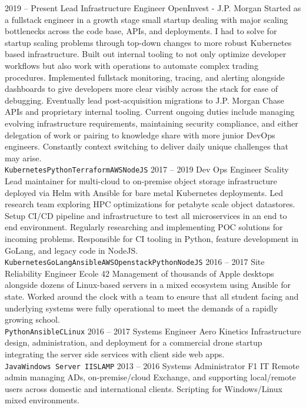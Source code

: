 \documentclass[10pt]{developercv} %
\begin{document}

\begin{entrylist}
	\entry
		{2019 -- Present}
		{\Large Lead Infrastructure Engineer}
		{\large OpenInvest - J.P. Morgan}
		{\small Started as a fullstack engineer in a growth stage small startup dealing with major scaling bottlenecks across the code base, APIs, and deployments. I
		had to solve for startup scaling problems through top-down changes to more robust Kubernetes based infrastructure. Built out internal tooling
		to not only optimize developer workflows but also work with operations to automate complex trading procedures. Implemented fullstack monitoring, tracing,
		and alerting alongside dashboards to give developers more clear visibly across the stack for ease of debugging. Eventually lead post-acquisition
		migrations to J.P. Morgan Chase APIs and proprietary internal tooling. Current ongoing duties include managing evolving infrastructure requirements,
		maintaining security compliance, and either delegation of work or pairing to knowledge share with more junior DevOps engineers. Constantly
		context switching to deliver daily unique challenges that may arise. \\
		\texttt{Kubernetes}\slashsep\texttt{Python}\slashsep\texttt{Terraform}\slashsep\texttt{AWS}\slashsep\texttt{NodeJS}}
	\entry
		{2017 -- 2019}
		{\Large Dev Ops Engineer}
		{\large Scality}
		{\small Lead maintainer for multi-cloud to on-premise object storage infrastructure
		deployed via Helm with Ansible for bare metal Kubernetes deployments. Led research team exploring HPC optimizations for petabyte scale object datastores.
		Setup CI/CD pipeline and infrastructure to test all microservices in an end to end environment. Regularly
		researching and implementing POC solutions for incoming problems. Responsible for CI tooling in Python,
		feature development in GoLang, and legacy code in NodeJS.\\
		\texttt{Kubernetes}\slashsep\texttt{GoLang}\slashsep\texttt{Ansible}\slashsep\texttt{AWS}\slashsep\texttt{Openstack}\slashsep\texttt{Python}\slashsep\texttt{NodeJS}}
	\entry
		{2016 -- 2017}
		{\Large Site Reliability Engineer}
		{\large Ecole 42}
		{\small Management of thousands of Apple desktops alongside dozens of Linux-based servers in a mixed ecosystem using Ansible for state. Worked around
		the clock with a team to ensure that all student facing and underlying systems were fully operational to meet the demands of a rapidly growing school. \\
		\texttt{Python}\slashsep\texttt{Ansible}\slashsep\texttt{C}\slashsep\texttt{Linux}}
	\entry
		{2016 -- 2017}
		{\Large Systems Engineer}
		{\large Aero Kinetics}
		{\small Infrastructure design, administration, and deployment for a commercial drone startup integrating the server side services with client side web apps.\\
		\texttt{Java}\slashsep\texttt{Windows Server IIS}\slashsep\texttt{LAMP}}
	\entry
		{2013 -- 2016}
		{\Large Systems Administrator}
		{\large F1 IT}
		{\small Remote admin managing ADs, on-premise/cloud Exchange, and supporting local/remote users across domestic and international clients. Scripting for Windows/Linux mixed environments.}



\end{entrylist}
\end{document}
